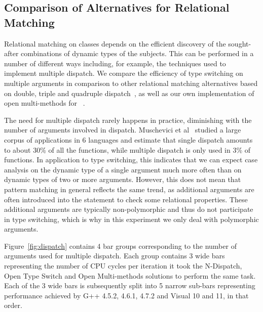 \subsection{Comparison of Alternatives for Relational Matching}
\label{sec:dd}

Relational matching on classes depends on the efficient discovery of the sought-after combinations of 
dynamic types of the subjects. This can be performed in a number of different 
ways including, for example, the techniques used to implement multiple dispatch.
We compare the efficiency of type switching on multiple arguments in comparison 
to other relational matching alternatives based on double, triple and quadruple 
dispatch~\cite{Ingalls86}, as well as our own implementation of open 
multi-methods for \Cpp{}~\cite{OpenMM}.

The need for multiple dispatch rarely happens in practice, diminishing with the 
number of arguments involved in dispatch. Muschevici et al~\cite{MPTN08} studied 
a large corpus of applications in 6 languages and estimate that single dispatch 
amounts to about 30\% of all the functions, while multiple dispatch is only used 
in 3\% of functions. In application to type switching, this indicates that we 
can expect case analysis on the dynamic type of a single argument much more often 
than on dynamic types of two or more arguments. However, this 
does not mean that pattern matching in general reflects the same trend, as 
additional arguments are often introduced into the  statement to 
check some relational properties. These additional arguments are typically 
non-polymorphic and thus do not participate in type switching, which is why in 
this experiment we only deal with polymorphic arguments.


Figure~\ref{fig:dispatch} contains 4 bar groups corresponding to the number 
of arguments used for multiple dispatch. Each group contains 3 wide bars 
representing the number of CPU cycles per iteration it took the N-Dispatch, Open Type 
Switch and Open Multi-methods solutions to perform the same task. Each of the 3 
wide bars is subsequently split into 5 narrow sub-bars representing performance 
achieved by G++ 4.5.2, 4.6.1, 4.7.2 and Visual \Cpp{} 10 and 11, in that order.


